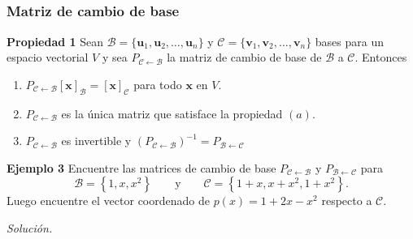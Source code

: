 \subsection{}

{\nologo
\begin{frame}\frametitle{Matriz de cambio de base}

\begin{prop}{\textbf{Propiedad 1}}
	\justifying
	Sean $\mathcal{B}=\{\mathbf{u}_1, \mathbf{u}_2, \hdots , \mathbf{u}_n \}$ y $\mathcal{C}=\{\mathbf{v}_1, \mathbf{v}_2, \hdots , \mathbf{v}_n \}$  bases para un espacio  vectorial $V$ y sea $P_{\mathcal{C} \leftarrow\mathcal{B}}$ la matriz de cambio 
	de base de $\mathcal{B}$ a $\mathcal{C}$. Entonces
	\begin{enumerate}
		\item[\labelname{$a$}] $P_{\mathcal{C} \leftarrow\mathcal{B}}\left[ \mathbf{x} \right]_{\mathcal{B}}=\left[ \mathbf{x} \right]_{\mathcal{C}}$ para todo $\mathbf{x}$ en $V$.
		\item[\labelname{$b$}] $P_{\mathcal{C} \leftarrow\mathcal{B}}$ es la única matriz que satisface la propiedad $(a)$.
		\item[\labelname{$c$}] $P_{\mathcal{C} \leftarrow\mathcal{B}}$ es invertible y $\left(P_{\mathcal{C} \leftarrow\mathcal{B}}\right)^{-1}=P_{\mathcal{B} \leftarrow\mathcal{C}}$		
	\end{enumerate}
\end{prop}	

\vspace{0mm}

\begin{ej}{\textbf{Ejemplo 3}}
	Encuentre las matrices de cambio de base $P_{\mathcal{C} \leftarrow\mathcal{B}}$ y $P_{\mathcal{B} \leftarrow\mathcal{C}}$
	para
	\[
		\mathcal{B} = \left\{ 1, x, x^2 \right\} \qquad \text{y} \qquad \mathcal{C} = \left\{ 1+x, x+x^2, 1+x^2 \right\}.
	\]
	Luego encuentre el vector coordenado de $p(x)=1+2x-x^2$ respecto a $\mathcal{C}$.
\end{ej}
\textit{Solución.}

\end{frame}
}


\subsection{}

